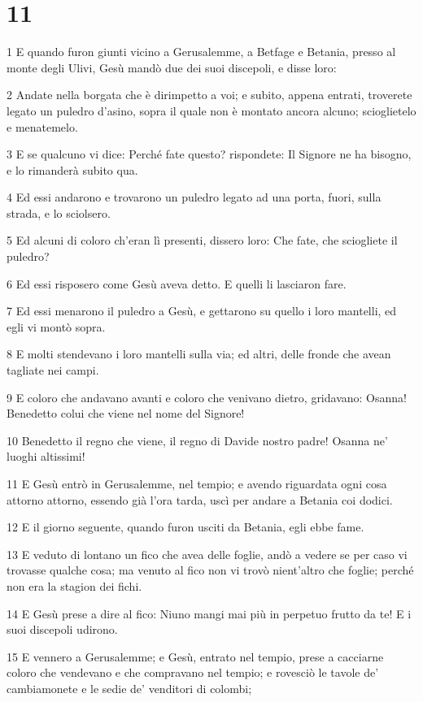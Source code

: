 \chapter{11}

\par 1 E quando furon giunti vicino a Gerusalemme, a Betfage e Betania, presso al monte degli Ulivi, Gesù mandò due dei suoi discepoli, e disse loro:
\par 2 Andate nella borgata che è dirimpetto a voi; e subito, appena entrati, troverete legato un puledro d'asino, sopra il quale non è montato ancora alcuno; scioglietelo e menatemelo.
\par 3 E se qualcuno vi dice: Perché fate questo? rispondete: Il Signore ne ha bisogno, e lo rimanderà subito qua.
\par 4 Ed essi andarono e trovarono un puledro legato ad una porta, fuori, sulla strada, e lo sciolsero.
\par 5 Ed alcuni di coloro ch'eran lì presenti, dissero loro: Che fate, che sciogliete il puledro?
\par 6 Ed essi risposero come Gesù aveva detto. E quelli li lasciaron fare.
\par 7 Ed essi menarono il puledro a Gesù, e gettarono su quello i loro mantelli, ed egli vi montò sopra.
\par 8 E molti stendevano i loro mantelli sulla via; ed altri, delle fronde che avean tagliate nei campi.
\par 9 E coloro che andavano avanti e coloro che venivano dietro, gridavano: Osanna! Benedetto colui che viene nel nome del Signore!
\par 10 Benedetto il regno che viene, il regno di Davide nostro padre! Osanna ne' luoghi altissimi!
\par 11 E Gesù entrò in Gerusalemme, nel tempio; e avendo riguardata ogni cosa attorno attorno, essendo già l'ora tarda, uscì per andare a Betania coi dodici.
\par 12 E il giorno seguente, quando furon usciti da Betania, egli ebbe fame.
\par 13 E veduto di lontano un fico che avea delle foglie, andò a vedere se per caso vi trovasse qualche cosa; ma venuto al fico non vi trovò nient'altro che foglie; perché non era la stagion dei fichi.
\par 14 E Gesù prese a dire al fico: Niuno mangi mai più in perpetuo frutto da te! E i suoi discepoli udirono.
\par 15 E vennero a Gerusalemme; e Gesù, entrato nel tempio, prese a cacciarne coloro che vendevano e che compravano nel tempio; e rovesciò le tavole de' cambiamonete e le sedie de' venditori di colombi;
